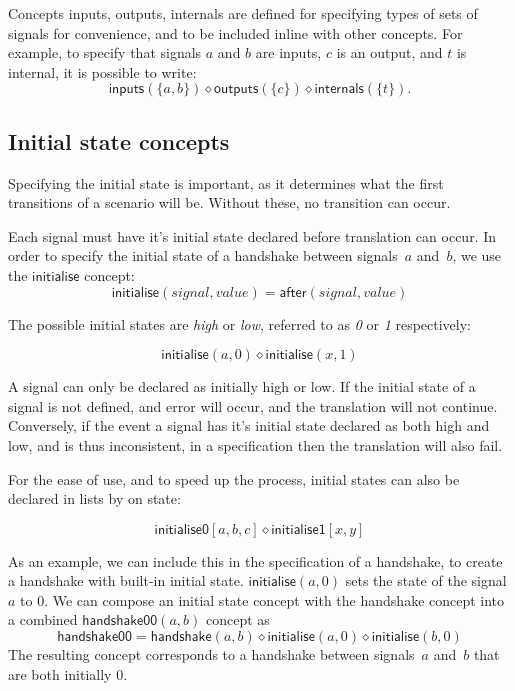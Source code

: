 \documentclass[british, journal]{IEEEtran}
\begin{document}
Concepts \textsf{inputs}, \textsf{outputs}, \textsf{internals} are defined for
specifying types of sets of signals for convenience, and to be included inline with other
concepts. For example, to specify
that signals $a$ and $b$ are inputs, $c$ is an output, and $t$ is internal, it
is possible to write:
\[
\mathsf{inputs}(\{a, b\}) \diamond \mathsf{outputs}(\{c\}) \diamond
\mathsf{internals}(\{t\}).
\]

\vspace{-5mm}

\subsection{Initial state concepts \label{sub:initState}}

Specifying the initial state is important, as it determines what the first transitions
of a scenario will be. Without these, no transition can occur.

Each signal must have it's initial state declared before translation can occur. 
In order to specify the initial state of a handshake between signals~$a$
and~$b$, we use the $\mathsf{initialise}$ concept:
\[
\mathsf{initialise}(\mathit{signal},\mathit{value})=\mathsf{after}(signal,
value)
\]

\noindent The possible initial states are \emph{high} or \emph{low}, referred to as \emph{0} 
or \emph{1} respectively:

\[
\mathsf{initialise}(a,0) \diamond \mathsf{initialise}(x, 1)
\]

\noindent A signal can only be declared as initially high or low. If the initial state of a signal is 
not defined, and error will occur, and the translation will not continue. Conversely, 
if the event a signal has it's initial state declared as both high and low,
and is thus inconsistent, in a specification then the translation will also fail.

For the ease of use, and to speed up the process, initial states can also be declared
in lists by on state:

\[
\mathsf{initialise0} [a, b, c] \diamond \mathsf{initialise1} [x, y]
\]


\noindent As an example, we can include this in the specification of a handshake, to 
create a handshake with built-in initial state.
$\mathsf{initialise}(a, 0)$ sets the state of the signal
$a$ to $0$. We can compose an initial state concept with the handshake concept
into a combined $\mathsf{handshake00}(a, b)$ concept as
\[
\mathsf{handshake00} = \mathsf{handshake}(a, b) \diamond \mathsf{initialise}(a, 0) \diamond
\mathsf{initialise}(b, 0)
\]
The resulting concept corresponds to a handshake between signals~$a$
and~$b$ that are both initially $0$.
\end{document}
